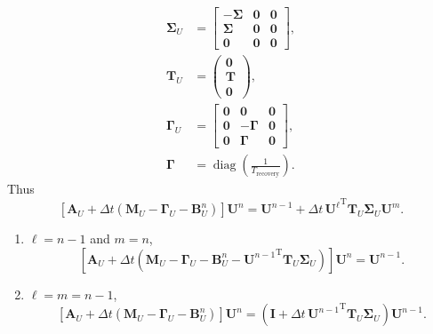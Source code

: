 \documentclass{article}
\renewcommand{\vec}[1]{\mathbf{#1}}
\newcommand{\mat}[1]{\mathbf{#1}}
\newcommand{\mT}{\mathrm{T}}
\DeclareMathOperator{\diag}{diag}
\begin{document}
\begin{equation}
\begin{split}
    \mat{\Sigma}_U &=
    \begin{bmatrix}
      - \mat{\Sigma} & \mat{0} & \mat{0}
      \\
      \mat{\Sigma} & \mat{0} & \mat{0}
      \\
      \mat{0} & \mat{0} & \mat{0}
    \end{bmatrix},
    \\
    \mat{T}_U &=
    \begin{pmatrix}
      \vec{0} \\ \vec{T} \\ \vec{0}
    \end{pmatrix},
    \\
    \mat{\Gamma}_U &=
    \begin{bmatrix}
      \mat{0} & \mat{0} & \mat{0}
      \\
      \mat{0} & - \mat{\Gamma} & \mat{0}
      \\
      \mat{0} & \mat{\Gamma} & \mat{0}
    \end{bmatrix},
    \\
    \mat{\Gamma} &= \diag\left(\frac{1}{T_{\text{recovery}}}\right).
  \end{split}
\end{equation}
Thus
\begin{equation}
  \left[\mat{A}_U + \Delta t \left(\mat{M}_U - \mat{\Gamma}_U
    - \mat{B}_U^n\right)\right] \vec{U}^n
  =
  \vec{U}^{n - 1}
  + \Delta t \, {\vec{U}^{\ell}}^{\mT} \vec{T}_U \mat{\Sigma}_U \vec{U}^m.
\end{equation}

\begin{enumerate}
\item $\ell = n - 1$ and $m = n$,
  \begin{equation}
    \left[\mat{A}_U + \Delta t \left(\mat{M}_U - \mat{\Gamma}_U
        - \mat{B}_U^n
        - {\vec{U}^{n-1}}^{\mT} \vec{T}_U \mat{\Sigma}_U\right)\right] \vec{U}^n
    =
    \vec{U}^{n - 1}.
  \end{equation}
\item $\ell = m = n - 1$,
  \begin{equation}
    \left[\mat{A}_U + \Delta t \left(\mat{M}_U - \mat{\Gamma}_U
      - \mat{B}_U^n\right)\right] \vec{U}^n
    =
    \left(\mat{I}
      + \Delta t \, {\vec{U}^{n - 1}}^{\mT} \vec{T}_U \mat{\Sigma}_U\right)
    \vec{U}^{n - 1}.
  \end{equation}
\end{enumerate}

\pagebreak




\end{document}
